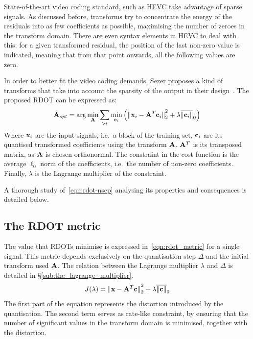 \documentclass[11pt,a4paper,openright,twoside]{book}
\numberwithin{equation}{section} %
\numberwithin{figure}{section} %
\numberwithin{table}{section} %
\begin{document}
State-of-the-art video coding standard, such as \ac{HEVC} take advantage
of sparse signals.
As discussed before, transforms try to concentrate the energy of the
residuals into as few coefficients as possible, maximising the number of
zeroes in the transform domain.
There are even syntax elements in \ac{HEVC} to deal with this:
for a given transformed residual, the position of the last non-zero
value is indicated, meaning that from that point onwards, all the
following values are zero.

In order to better fit the video coding demands, Sezer proposes a kind
of transforms that take into account the sparsity of the output in their
design~\cite{sezer-11-phd}.
The proposed \ac{RDOT} can be expressed as:
\begin{equation}
	\mathbf{A}_{opt} = \text{arg}\min\limits_{\mathbf{A}}
	\sum_{\forall i} \min\limits_{\mathbf{c}_i}
	\left(
	{\Vert \mathbf{x}_i - \mathbf{A}^T\mathbf{c}_i \Vert}_2^2 + \lambda\overline{\Vert \mathbf{c}_i \Vert}_0
	\right)
	\label{eqn:rdot-nsep}
\end{equation}
Where $\mathbf{x}_i$ are the input signals, i.e.\ a block of the training set,
$\mathbf{c}_i$ are its quantised transformed coefficients using the transform
$\mathbf{A}$.
$\mathbf{A}^T$ is its transposed matrix, as $\mathbf{A}$ is chosen orthonormal.
The constraint in the cost function is the average $\ell_0$ norm of the
coefficients, i.e.\ the number of non-zero coefficients.
Finally, $\lambda$ is the Lagrange multiplier of the constraint.

A thorough study of~\eqref{eqn:rdot-nsep} analysing its properties and
consequences is detailed below.

\subsection{The \acs{RDOT} metric}
\label{sub:the_rdot_metric}

The value that \acp{RDOT} minimise is expressed
in~\eqref{eqn:rdot_metric} for a single signal.
This metric depends exclusively on the quantisation step $\Delta$ and the
initial transform used $\mathbf{A}$.
The relation between the Lagrange multiplier $\lambda$ and $\Delta$ is
detailed in \S\ref{sub:the_lagrange_multiplier}.
\begin{equation}
	J (\lambda) =
	{\Vert \mathbf{x} - \mathbf{A}^T \mathbf{c} \Vert}_2^2 + \lambda\overline{\Vert \mathbf{c} \Vert}_0
	\label{eqn:rdot_metric}
\end{equation}
The first part of the equation represents the distortion introduced by
the quantisation.
The second term serves as rate-like constraint, by ensuring that the
number of significant values in the transform domain is minimised,
together with the distortion.
\end{document}
